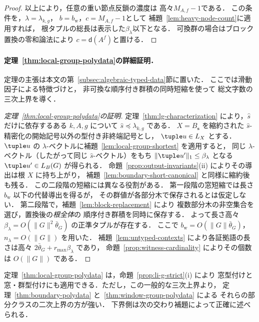 \begin{proof}
以上により，任意の重い節点反鎖の濃度は
高々$M_{A,f}-1$である．
この条件を，$\lambda=\lambda_{k,g}$，
$b=b_{\mathrm w}$，$c=M_{A,f}-1$として
補題~\ref{lem:heavy-node-count}に適用すれば，
根タプルの総長は表示した$\beta_\lambda$以下となる．
可換群の場合はブロック置換の零和論法により
$c=\mathsf d(A^f)$と置ける．
\end{proof}

\paragraph{定理~\ref{thm:local-group-polydata}の詳細証明．}
定理の主張は本文の第~\ref{subsec:algebraic-typed-data}節に置いた．
ここでは滑動因子による特徴づけと，
非可換な順序付き群積の同時短縮を使って
総文字数の三次上界を導く．



\begin{proof}[定理~\ref{thm:local-group-polydata}の証明]
定理~\ref{thm:lg-characterization} により，$\widehat{s}$ だけに依存するある $k,A,g$ について
$\widehat{s}\preceq\lambda_{k,g}$ である．
$X=B_{\mathbf s}$ を縮約された $\widehat{s}$-精密化の開始記号以外の型付き非終端記号とし，
$\tuple u\in L_X$ とする．
$\tuple u$ の $\lambda$-ベクトルに補題~\ref{lem:local-group-shortest} を適用すると，
同じ $\lambda$-ベクトル（したがって同じ $\widehat{s}$-ベクトル）をもち
$\|\tuple u'\|_1\le\beta_\lambda$ となる $\tuple u'\in L_B(G)$ が得られる．
命題~\ref{prop:output-invariants}(ii) によりその導出は根 $X$ に持ち上がり，
補題~\ref{lem:boundary-short-canonical} と同様に縮約後も残る．
この二段階の短縮には異なる役割がある．
第一段階の窓短縮では長さ $b_{\mathrm w}$ 以下の代替導出を得るが，
その群値が各部分木で保存されるとは仮定しない．
第二段階で，補題~\ref{lem:block-replacement} により
複数部分木の非空集合を選び，置換後の\emph{根全体}の
順序付き群積を同時に保存する．
よって長さ高々 $\beta_\lambda=O(\|G\|^2\bar\theta_G)$ の正準タプルが存在する．
ここで $b_{\mathrm w}=O(\|G\|\bar\theta_G)$，$n_\lambda=O(\|G\|)$ を用いた．
補題~\ref{lem:untyped-contexts} により各証拠語の長さは高々
$2\bar\theta_G+r_{\max}\beta_\lambda$ であり，
命題~\ref{prop:witness-cardinality} によりその個数は $O(\|G\|)$ である．
\end{proof}

定理~\ref{thm:local-group-polydata} は，命題~\ref{prop:li-g-strict}(i) により
窓型付けと窓・群型付けにも適用できる．ただし，この一般的な三次上界より，
定理~\ref{thm:boundary-polydata} と~\ref{thm:window-group-polydata} による
それらの部分クラスの二次上界の方が強い．
下界側は次の交わり補題によって正確に述べられる．

